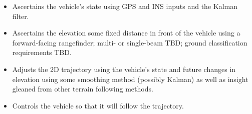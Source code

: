 \documentclass[10pt,a4paper]{report}
\begin{document}
\begin{itemize}
\item Ascertains the vehicle's state using GPS and INS inputs and the Kalman filter.
\item Ascertains the elevation some fixed distance in front of the vehicle using a forward-facing rangefinder; multi- or single-beam TBD; ground classification requirements TBD.
\item Adjusts the 2D trajectory using the vehicle's state and future changes in elevation using some smoothing method (possibly Kalman) as well as insight gleaned from other terrain following methods.
\item Controls the vehicle so that it will follow the trajectory.
\end{itemize}




\end{document}
